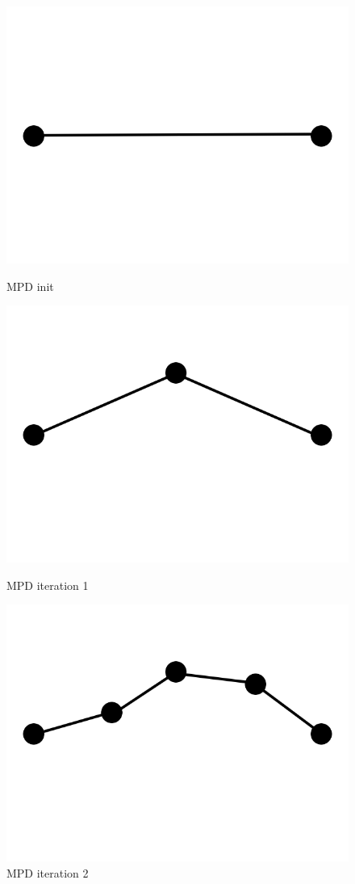 \documentclass[11pt,a4paper,twoside,openright]{report}
\begin{document}
\begin{figure}[!htb]
  \includegraphics[width=\linewidth]{mpd0.png}
  \caption{MPD init}\label{fig:mpd0}
\endminipage\hfill
{}
  \includegraphics[width=\linewidth]{mpd1.png}
  \caption{MPD iteration 1}\label{fig:mpd1}
\endminipage\hfill
{}%
  \includegraphics[width=\linewidth]{mpd2.png}
  \caption{MPD iteration 2}\label{fig:mpd2}
\endminipage
\end{figure}
\end{document}
